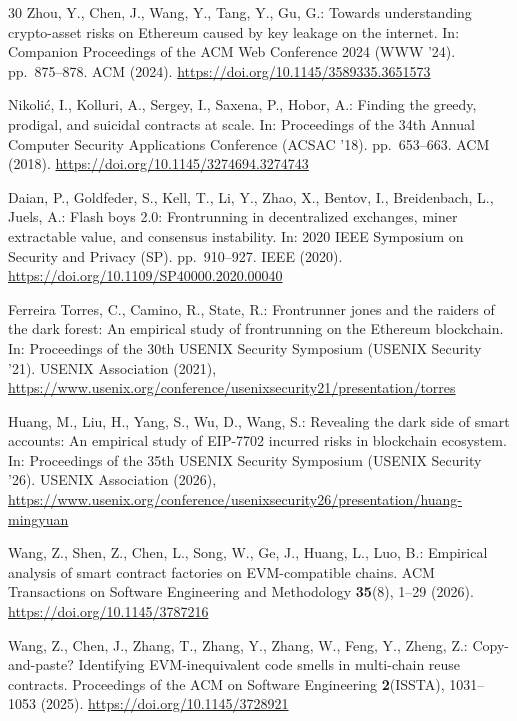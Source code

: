 \documentclass[runningheads]{llncs}
\begin{document}
\begin{thebibliography}{30}
Zhou, Y., Chen, J., Wang, Y., Tang, Y., Gu, G.: Towards understanding crypto-asset risks on Ethereum caused by key leakage on the internet. In: Companion Proceedings of the ACM Web Conference 2024 (WWW '24). pp.~875--878. ACM (2024). \url{https://doi.org/10.1145/3589335.3651573}

Nikoli\'{c}, I., Kolluri, A., Sergey, I., Saxena, P., Hobor, A.: Finding the greedy, prodigal, and suicidal contracts at scale. In: Proceedings of the 34th Annual Computer Security Applications Conference (ACSAC '18). pp.~653--663. ACM (2018). \url{https://doi.org/10.1145/3274694.3274743}

Daian, P., Goldfeder, S., Kell, T., Li, Y., Zhao, X., Bentov, I., Breidenbach, L., Juels, A.: Flash boys 2.0: Frontrunning in decentralized exchanges, miner extractable value, and consensus instability. In: 2020 IEEE Symposium on Security and Privacy (SP). pp.~910--927. IEEE (2020). \url{https://doi.org/10.1109/SP40000.2020.00040}

Ferreira Torres, C., Camino, R., State, R.: Frontrunner jones and the raiders of the dark forest: An empirical study of frontrunning on the Ethereum blockchain. In: Proceedings of the 30th USENIX Security Symposium (USENIX Security '21). USENIX Association (2021), \url{https://www.usenix.org/conference/usenixsecurity21/presentation/torres}

Huang, M., Liu, H., Yang, S., Wu, D., Wang, S.: Revealing the dark side of smart accounts: An empirical study of EIP-7702 incurred risks in blockchain ecosystem. In: Proceedings of the 35th USENIX Security Symposium (USENIX Security '26). USENIX Association (2026), \url{https://www.usenix.org/conference/usenixsecurity26/presentation/huang-mingyuan}

Wang, Z., Shen, Z., Chen, L., Song, W., Ge, J., Huang, L., Luo, B.: Empirical analysis of smart contract factories on EVM-compatible chains. ACM Transactions on Software Engineering and Methodology \textbf{35}(8), 1--29 (2026). \url{https://doi.org/10.1145/3787216}

Wang, Z., Chen, J., Zhang, T., Zhang, Y., Zhang, W., Feng, Y., Zheng, Z.: Copy-and-paste? Identifying EVM-inequivalent code smells in multi-chain reuse contracts. Proceedings of the ACM on Software Engineering \textbf{2}(ISSTA), 1031--1053 (2025). \url{https://doi.org/10.1145/3728921}


\end{thebibliography}
\end{document}

